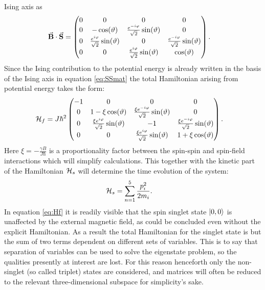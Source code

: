 \documentclass[a4paper]{article}
\begin{document}
Ising axis as
\begin{align*}
    \va{B}\cdot \va{S} &= \pmqty{
            0 & 0 & 0 & 0\\
            0 & -\cos(\vartheta) & \frac{e^{-i\varphi}}{\sqrt{2} }\sin(\vartheta) & 0\\
                    0 & \frac{e^{i\varphi}}{\sqrt{2} }\sin(\vartheta) & 0 &
                    \frac{e^{-i\varphi}}{\sqrt{2} }\sin(\vartheta)\\
                    0 & 0 & \frac{e^{i\varphi}}{\sqrt{2} }\sin(\vartheta) & \cos(\vartheta)
            }
.\end{align*}
Since the Ising contribution to the potential energy is already written in the basis of the
Ising axis in equation \ref{eq:SSmat} the total Hamiltonian arising from potential energy
takes the form:
\begin{align}\label{eq:Hf}
        \mathbb{\cal H}_f &= J\hbar{}^2 \pmqty{
                -1 & 0 & 0 & 0\\
                0 & 1 - \xi \cos(\vartheta)& \frac{\xi e^{-i\varphi}}{\sqrt{2}
                }\sin(\vartheta) & 0\\
                0 & \frac{\xi e^{i\varphi}}{\sqrt{2} }\sin(\vartheta) & -1 & \frac{\xi
                e^{-i\varphi}}{\sqrt{2} }\sin(\vartheta)\\
                0 & 0 & \frac{\xi e^{i\varphi}}{\sqrt{2} }\sin(\vartheta) & 1 + \xi\cos(\vartheta)
        }
.\end{align}
Here \(\xi = -\frac{\gamma B}{J\hbar{}}\) is a proportionality factor between the spin-spin
and spin-field interactions which will simplify calculations. This together with the
kinetic part of the Hamiltonian \(\mathbb{\cal H}_s\) will determine the time evolution of
the system:
\begin{align}\label{eq:Hs}
        \mathbb{\cal H}_s &= \sum_{n=1}^{5} \frac{p_i^2}{2m_i}
.\end{align}
In equation \ref{eq:Hf} it is readily visible that the spin singlet state \(\ket{0, 0}\) is unaffected by
the external magnetic field, as could be concluded even without the explicit Hamiltonian.
As a result the total Hamiltonian for the singlet state is but the sum of two terms
dependent on different sets of variables. This is to say that separation of variables can
be used to solve the eigenstate problem, so the qualities presently at interest are lost.
For this reason henceforth only the non-singlet (so called triplet) states are considered,
and matrices will often be reduced to the relevant three-dimensional subspace for
simplicity's sake.
\end{document}
